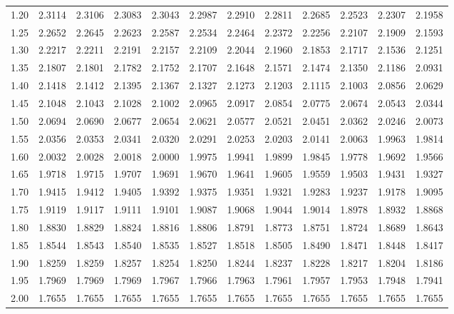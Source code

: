 \begin{tabular}{cccccccccccc}
1.20 & 2.3114 & 2.3106 & 2.3083 & 2.3043 & 2.2987 & 2.2910 & 2.2811 & 2.2685 & 2.2523 & 2.2307 & 2.1958 \\
1.25 & 2.2652 & 2.2645 & 2.2623 & 2.2587 & 2.2534 & 2.2464 & 2.2372 & 2.2256 & 2.2107 & 2.1909 & 2.1593 \\
1.30 & 2.2217 & 2.2211 & 2.2191 & 2.2157 & 2.2109 & 2.2044 & 2.1960 & 2.1853 & 2.1717 & 2.1536 & 2.1251 \\
1.35 & 2.1807 & 2.1801 & 2.1782 & 2.1752 & 2.1707 & 2.1648 & 2.1571 & 2.1474 & 2.1350 & 2.1186 & 2.0931 \\
1.40 & 2.1418 & 2.1412 & 2.1395 & 2.1367 & 2.1327 & 2.1273 & 2.1203 & 2.1115 & 2.1003 & 2.0856 & 2.0629 \\
1.45 & 2.1048 & 2.1043 & 2.1028 & 2.1002 & 2.0965 & 2.0917 & 2.0854 & 2.0775 & 2.0674 & 2.0543 & 2.0344 \\
1.50 & 2.0694 & 2.0690 & 2.0677 & 2.0654 & 2.0621 & 2.0577 & 2.0521 & 2.0451 & 2.0362 & 2.0246 & 2.0073 \\
1.55 & 2.0356 & 2.0353 & 2.0341 & 2.0320 & 2.0291 & 2.0253 & 2.0203 & 2.0141 & 2.0063 & 1.9963 & 1.9814 \\
1.60 & 2.0032 & 2.0028 & 2.0018 & 2.0000 & 1.9975 & 1.9941 & 1.9899 & 1.9845 & 1.9778 & 1.9692 & 1.9566 \\
1.65 & 1.9718 & 1.9715 & 1.9707 & 1.9691 & 1.9670 & 1.9641 & 1.9605 & 1.9559 & 1.9503 & 1.9431 & 1.9327 \\
1.70 & 1.9415 & 1.9412 & 1.9405 & 1.9392 & 1.9375 & 1.9351 & 1.9321 & 1.9283 & 1.9237 & 1.9178 & 1.9095 \\
1.75 & 1.9119 & 1.9117 & 1.9111 & 1.9101 & 1.9087 & 1.9068 & 1.9044 & 1.9014 & 1.8978 & 1.8932 & 1.8868 \\
1.80 & 1.8830 & 1.8829 & 1.8824 & 1.8816 & 1.8806 & 1.8791 & 1.8773 & 1.8751 & 1.8724 & 1.8689 & 1.8643 \\
1.85 & 1.8544 & 1.8543 & 1.8540 & 1.8535 & 1.8527 & 1.8518 & 1.8505 & 1.8490 & 1.8471 & 1.8448 & 1.8417 \\
1.90 & 1.8259 & 1.8259 & 1.8257 & 1.8254 & 1.8250 & 1.8244 & 1.8237 & 1.8228 & 1.8217 & 1.8204 & 1.8186 \\
1.95 & 1.7969 & 1.7969 & 1.7969 & 1.7967 & 1.7966 & 1.7963 & 1.7961 & 1.7957 & 1.7953 & 1.7948 & 1.7941 \\
2.00 & 1.7655 & 1.7655 & 1.7655 & 1.7655 & 1.7655 & 1.7655 & 1.7655 & 1.7655 & 1.7655 & 1.7655 & 1.7655 \\
\bottomrule
\end{tabular}
